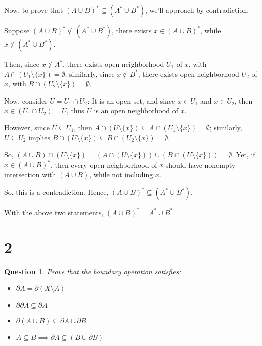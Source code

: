 \documentclass{article}
\newtheorem{question}{Question}
\begin{document}
\begin{itemize}
    \hfill

    Now, to prove that $(A\cup B)^* \subseteq (A^*\cup B^*)$, we'll approach by contradiction:

    Suppose $(A\cup B)^*\not\subseteq (A^*\cup B^*)$, there exists $x\in (A\cup B)^*$, while $x\notin (A^*\cup B^*)$.

    Then, since $x\notin A^*$, there exists open neighborhood $U_1$ of $x$, with $A\cap (U_1\setminus\{x\})=\emptyset$;
    similarly, since $x\notin B^*$, there exists open neighborhood $U_2$ of $x$, with $B\cap (U_2\setminus\{x\})=\emptyset$.

    Now, consider $U=U_1\cap U_2$: It is an open set, and since $x\in U_1$ and $x\in U_2$, then $x\in (U_1\cap U_2)=U$, thus $U$ is an open neighborhood of $x$.

    However, since $U\subseteq U_1$, then $A\cap (U\setminus\{x\})\subseteq A\cap (U_1\setminus\{x\})=\emptyset$; similarly, $U\subseteq U_2$ implies $B\cap (U\setminus\{x\})\subseteq B\cap (U_2\setminus\{x\})=\emptyset$.

    So, $(A\cup B)\cap (U\setminus\{x\})=(A\cap (U\setminus\{x\}))\cup (B\cap (U\setminus\{x\}))=\emptyset$. Yet, if $x\in (A\cup B)^*$, 
    then every open neighborhood of $x$ should have nonempty intersection with $(A\cup B)$, while not including $x$.

    So, this is a contradiction. Hence, $(A\cup B)^*\subseteq (A^*\cup B^*)$.

    \hfill

    With the above two statements, $(A\cup B)^*=A^*\cup B^*$.
\end{itemize}

\hfill

\hfill

\section*{2}
\begin{myBox}[]{}
    \begin{question}
        Prove that the boundary operation satisfies:
        \begin{itemize}
            \item $\partial A=\partial(X\setminus A)$
            \item $\partial\partial A\subseteq \partial A$
            \item $\partial(A\cup B)\subseteq \partial A\cup \partial B$
            \item $A\subseteq B\implies \partial A\subseteq (B\cup \partial B)$
        \end{itemize}
    \end{question}
\end{myBox}
\end{document}
